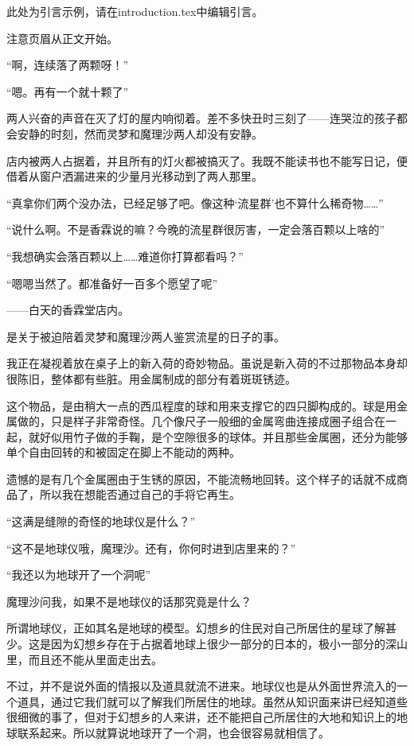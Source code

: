 此处为引言示例，请在introduction.tex中编辑引言。

注意页眉从正文开始。

“啊，连续落了两颗呀！”

“嗯。再有一个就十颗了”

两人兴奋的声音在灭了灯的屋内响彻着。差不多快丑时三刻了——连哭泣的孩子都会安静的时刻，然而灵梦和魔理沙两人却没有安静。

店内被两人占据着，并且所有的灯火都被搞灭了。我既不能读书也不能写日记，便借着从窗户洒漏进来的少量月光移动到了两人那里。

“真拿你们两个没办法，已经足够了吧。像这种‘流星群’也不算什么稀奇物……”

“说什么啊。不是香霖说的嘛？今晚的流星群很厉害，一定会落百颗以上啥的”

“我想确实会落百颗以上……难道你打算都看吗？”

“嗯嗯当然了。都准备好一百多个愿望了呢”

——白天的香霖堂店内。

是关于被迫陪着灵梦和魔理沙两人鉴赏流星的日子的事。

我正在凝视着放在桌子上的新入荷的奇妙物品。虽说是新入荷的不过那物品本身却很陈旧，整体都有些脏。用金属制成的部分有着斑斑锈迹。

这个物品，是由稍大一点的西瓜程度的球和用来支撑它的四只脚构成的。球是用金属做的，只是样子非常奇怪。几个像尺子一般细的金属弯曲连接成圈子组合在一起，就好似用竹子做的手鞠，是个空隙很多的球体。并且那些金属圈，还分为能够单个自由回转的和被固定在脚上不能动的两种。

遗憾的是有几个金属圈由于生锈的原因，不能流畅地回转。这个样子的话就不成商品了，所以我在想能否通过自己的手将它再生。

“这满是缝隙的奇怪的地球仪是什么？”

“这不是地球仪哦，魔理沙。还有，你何时进到店里来的？”

“我还以为地球开了一个洞呢”

魔理沙问我，如果不是地球仪的话那究竟是什么？

所谓地球仪，正如其名是地球的模型。幻想乡的住民对自己所居住的星球了解甚少。这是因为幻想乡存在于占据着地球上很少一部分的日本的，极小一部分的深山里，而且还不能从里面走出去。

不过，并不是说外面的情报以及道具就流不进来。地球仪也是从外面世界流入的一个道具，通过它我们就可以了解我们所居住的地球。虽然从知识面来讲已经知道些很细微的事了，但对于幻想乡的人来讲，还不能把自己所居住的大地和知识上的地球联系起来。所以就算说地球开了一个洞，也会很容易就相信了。

